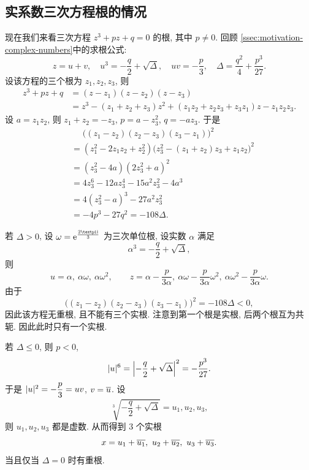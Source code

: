 \subsection{实系数三次方程根的情况\optional}
\label{ssec:real-cubic-equation}

现在我们来看三次方程 $z^3+pz+q=0$ 的根, 其中 $p\neq 0$.
回顾 \ref{ssec:motivation-complex-numbers}中的求根公式:
\[
  z=u+v,\quad 
  u^3=-\frac q2+\sqrt{\Delta},\quad 
  uv=-\frac p3,\quad 
  \Delta=\frac{q^2}4+\frac{p^3}{27}.
\]
设该方程的三个根为 $z_1,z_2,z_3$, 则
\begin{align*}
   z^3+pz+q&
  =(z-z_1)(z-z_2)(z-z_3)\\&
  =z^3-(z_1+z_2+z_3)z^2+(z_1z_2+z_2z_3+z_3z_1)z-z_1z_2z_3.
\end{align*}
设 $a=z_1z_2$, 则 $z_1+z_2=-z_3$, $p=a-z_3^2$, $q=-az_3$.
于是
\begin{align*}
    &\mathrel{\phantom{=}}
  \bigl((z_1-z_2)(z_2-z_3)(z_3-z_1)\bigr)^2\\&
  =(z_1^2-2z_1z_2+z_2^2)\bigl(z_3^2-(z_1+z_2)z_3+z_1z_2\bigr)^2\\&
  =(z_3^2-4a)(2z_3^2+a)^2\\&
  =4z_3^6-12az_3^4-15a^2z_3^2-4a^3\\&
  =4(z_3^2-a)^3-27a^2z_3^2\\&
  =-4p^3-27q^2
  =-108\Delta.
\end{align*}


\begin{enuma}
  \item 若 $\Delta>0$, 设 $\omega=\ee^{\frac{2\cpi \ii}3}$ 为三次单位根, 设实数 $\alpha$ 满足
  \[\alpha^3=-\frac q2+\sqrt{\Delta},\]
  则
  \[
    u=\alpha,\ \alpha\omega,\ \alpha\omega^2,\qquad
    z=\alpha-\frac p{3\alpha},\ 
      \alpha\omega-\frac p{3\alpha} \omega^2,\ 
      \alpha\omega^2-\frac p{3\alpha} \omega.
  \]
  由于
  \[
      \bigl((z_1-z_2)(z_2-z_3)(z_3-z_1)\bigr)^2
    =-108\Delta<0,
  \]
  因此该方程无重根, 且不能有三个实根.
  注意到第一个根是实根, 后两个根互为共轭.
  因此此时只有一个实根.
  \item 若 $\Delta\le 0$, 则 $p<0$,
  \[
    \lvert u\rvert^6=\Bigl\vert-\frac q2+\sqrt\Delta\Bigr\vert^2=-\frac{p^3}{27}.
  \]
  于是 $\lvert u\rvert^2=-\dfrac p3=uv$, $v=\overline u$.
  设
  \[
    \sqrt[3]{-\frac q2+\sqrt{\Delta}}=u_1,u_2,u_3,
  \]
  则 $u_1,u_2,u_3$ 都是虚数. 从而得到 $3$ 个实根
  \[
    x=u_1+\ov{u_1},\ u_2+\ov{u_2},\ u_3+\ov{u_3}.
  \]
  当且仅当 $\Delta=0$ 时有重根.
\end{enuma}


